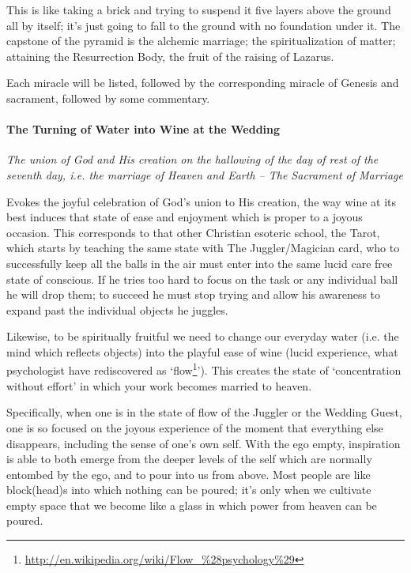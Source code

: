 This is like taking a brick and trying to suspend it five layers above the ground all by itself; it's just going to fall to the ground with no foundation under it. The capstone of the pyramid is the alchemic marriage; the spiritualization of matter; attaining the Resurrection Body, the fruit of the raising of Lazarus.

Each miracle will be listed, followed by the corresponding miracle of Genesis and sacrament, followed by some commentary.

\paragraph{The Turning of Water into Wine at the Wedding}


\emph{The union of God and His creation on the hallowing of the day of rest of the seventh day, i.e. the marriage of Heaven and Earth -- The Sacrament of Marriage}

Evokes the joyful celebration of God's union to His creation, the way wine at its best induces that state of ease and enjoyment which is proper to a joyous occasion. This corresponds to that other Christian esoteric school, the Tarot, which starts by teaching the same state with The Juggler/Magician card, who to successfully keep all the balls in the air must enter into the same lucid care free state of conscious. If he tries too hard to focus on the task or any individual ball he will drop them; to succeed he must stop trying and allow his awareness to expand past the individual objects he juggles.

Likewise, to be spiritually fruitful we need to change our everyday water (i.e. the mind which reflects objects) into the playful ease of wine (lucid experience, what psychologist have rediscovered as `flow\footnote{\url{http://en.wikipedia.org/wiki/Flow_\%28psychology\%29}}'). This creates the state of `concentration without effort' in which your work becomes married to heaven.

Specifically, when one is in the state of flow of the Juggler or the Wedding Guest, one is so focused on the joyous experience of the moment that everything else disappears, including the sense of one's own self. With the ego empty, inspiration is able to both emerge from the deeper levels of the self which are normally entombed by the ego, and to pour into us from above. Most people are like block(head)s into which nothing can be poured; it's only when we cultivate empty space that we become like a glass in which power from heaven can be poured.

